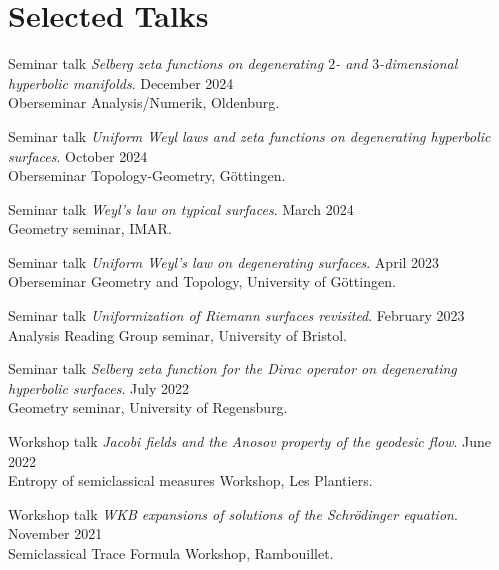 \documentclass[a4paper, 11pt]{article}
\begin{document}
\section{Selected Talks}
 \begin{itemize}[leftmargin=0.5cm]
 	{\item{
 			Seminar talk \textit{Selberg zeta functions on degenerating $2$- and $3$-dimensional \\ hyperbolic manifolds}.
 			\hfill
 			December 2024\\
 			Oberseminar Analysis/Numerik, Oldenburg.
 	}}
	{\item{
			Seminar talk \textit{Uniform Weyl laws and zeta functions on degenerating hyperbolic surfaces}.
			\hfill
			October 2024\\
			Oberseminar Topology-Geometry, G\" ottingen.
	}}
	{\item{
			Seminar talk \textit{Weyl's law on typical surfaces}.
			\hfill
			March 2024\\
			Geometry seminar, IMAR.
	}}
	{\item{
			Seminar talk \textit{Uniform Weyl's law on degenerating surfaces}.
			\hfill
			April 2023\\
			Oberseminar Geometry and Topology, University of Göttingen.
	}}
	{\item{
			Seminar talk \textit{Uniformization of Riemann surfaces revisited}.
			\hfill
			February 2023\\
			Analysis Reading Group seminar, University of Bristol.
	}}
	{\item{
		Seminar talk \textit{Selberg zeta function for the Dirac operator on degenerating hyperbolic surfaces}.
		\hfill
		July 2022\\
		Geometry seminar, University of Regensburg.
	}}
	{\item{
			Workshop talk \textit{Jacobi fields and the Anosov property of the geodesic flow}.
			\hfill
			June 2022\\
			Entropy of semiclassical measures Workshop, Les Plantiers.
	}}
	{\item{
			Workshop talk \textit{WKB expansions of solutions of the Schrödinger equation}.
			\hfill
			November 2021\\
			Semiclassical Trace Formula Workshop, Rambouillet.
	}}
\end{itemize}
\end{document}
